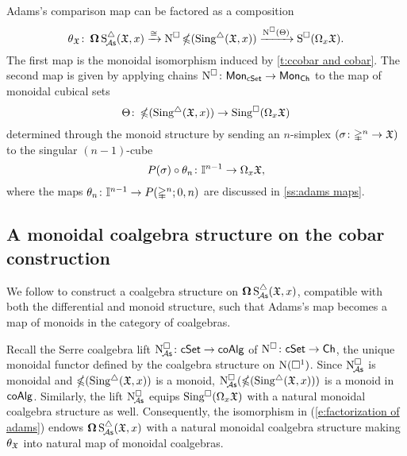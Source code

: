 Adams's comparison map can be factored as a composition
\begin{equation}\label{e:factorization of adams}
	\theta_\fX \colon \cobar \sSchainsA(\fX,x) \xrightarrow{\cong}
	\cchains \ccobar(\sSing(\fX,x)) \xrightarrow{\cchains(\Theta)}
	\cSchains(\loops_x \fX).
\end{equation}
The first map is the monoidal isomorphism induced by \cref{t:ccobar and cobar}.
The second map is given by applying chains $\cchains \colon \Mon_{\cSet} \to \Mon_{\Ch}$ to the map of monoidal cubical sets
\[
\Theta \colon \ccobar(\sSing(\fX,x)) \to \cSing(\loops_x \fX)
\]
determined through the monoid structure by sending an $n$-simplex $(\sigma \colon \gsimplex^n \to \fX)$ to the singular $(n-1)$-cube
\[
P(\sigma) \circ \theta_n \colon \gcube^{n-1} \to \loops_x \fX,
\]
where the maps $\theta_n \colon \gcube^{n-1} \to P(\gsimplex^n;0,n)$ are discussed in \cref{ss:adams maps}.

\subsection{A monoidal coalgebra structure on the cobar construction}

We follow \cite{baues1998hopf} to construct a coalgebra structure on $\cobar \sSchainsA(\fX,x)$, compatible with both the differential and monoid structure, such that Adams's map becomes a map of monoids in the category of coalgebras.

Recall the Serre coalgebra lift $\cchainsA \colon \cSet \to \coAlg$ of $\cchains \colon \cSet \to \Ch$, the unique monoidal functor defined by the coalgebra structure on $\chains(\cube^1)$.
Since $\cchainsA$ is monoidal and $\ccobar(\sSing(\fX,x))$ is a monoid, $\cchainsA(\ccobar(\sSing(\fX,x)))$ is a monoid in $\coAlg$.
Similarly, the lift $\cchainsA$ equips $\cSing(\loops_x \fX)$ with a natural monoidal coalgebra structure as well.
Consequently, the isomorphism in (\ref{e:factorization of adams}) endows $\cobar \sSchainsA(\fX,x)$ with a natural monoidal coalgebra structure making $\theta_\fX$ into natural map of monoidal coalgebras.

